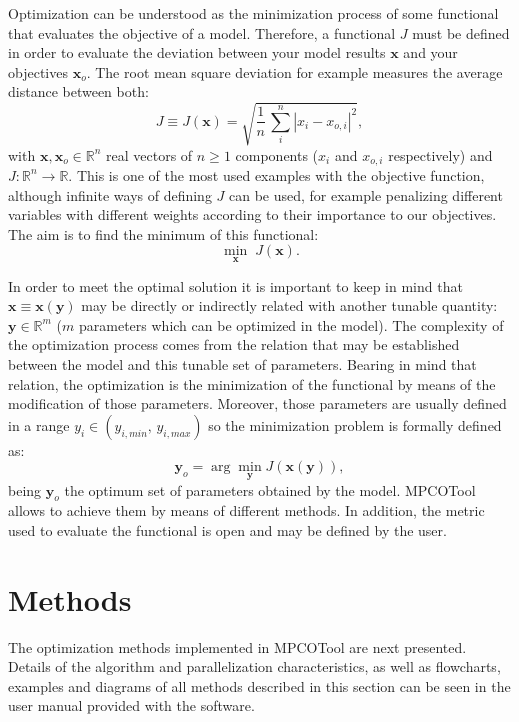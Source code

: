 \documentclass[review,authoryear]{elsarticle}
\newcommand{\EQ}[2]
{\begin{equation}#1\label{#2}\end{equation}}
\newcommand{\ABS}[1]{\left|#1\right|}
\newcommand{\PA}[1]{\left(#1\right)}
\begin{document}
Optimization can be understood as the minimization process of some functional
that evaluates the objective of a model. Therefore, a functional $J$ must be
defined in order to evaluate the deviation between your model results
$\mathbf{x}$ and your objectives $\mathbf{x}_o$. The root mean square deviation
for example measures the average distance between both:
\EQ
{
	J \equiv J\PA{\mathbf{x}}
	=\sqrt{\frac{1}{n}\,\sum_i^n\ABS{x_i-x_{o,i}}^2},
}{EqRMSD}
with $\mathbf{x},\mathbf{x}_o\in\mathbb{R}^n$ real vectors of $n\ge 1$
components ($x_i$ and $x_{o,i}$ respectively) and
$J:\mathbb{R}^n \rightarrow \mathbb{R}$. 
This is one of the most used examples with the objective function, although 
infinite ways of defining $J$ can be used, for example penalizing different
variables with different weights according to their importance to our
objectives. The aim is to find the minimum of this functional:
\EQ{\min_{\mathbf{x}}\;J\PA{\mathbf{x}}.}{EqFunctionalMin}

In order to meet the optimal solution it is important to keep in mind that
$\mathbf{x}\equiv\mathbf{x}\PA{\mathbf{y}}$ may be directly or indirectly
related with another tunable quantity: $\mathbf{y}\in\mathbb{R}^m$  ($m$
parameters which can be optimized in the model). The complexity of the
optimization process comes from the relation that may be established between the
model and this tunable set of parameters. Bearing in mind that relation, the
optimization is the minimization of the functional by means of the modification
of those parameters. Moreover, those parameters are usually defined in a range
$y_i\in\PA{y_{i,min},\,y_{i,max}}$ so the minimization problem is formally
defined as:
\EQ
{
	\mathbf{y}_o=\arg\min_{\mathbf{y}}J\PA{\mathbf{x}\PA{\mathbf{y}}},
}{EqParametersOptimal}
being $\mathbf{y}_o$ the optimum set of parameters obtained by the model.
MPCOTool allows to achieve them by means of different methods. In addition,
the metric used to evaluate the functional is open and may be defined by the
user.

\section{Methods}

The optimization methods implemented in MPCOTool are next presented.
Details of the algorithm and parallelization characteristics, as well as
flowcharts, examples and diagrams of all methods described in this section can
be seen in the user manual provided with the software.
\end{document}
